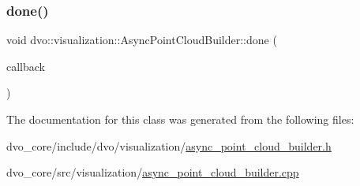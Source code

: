 \subsubsection{\texorpdfstring{done()}{done()}}
{\footnotesize\ttfamily void dvo\+::visualization\+::\+Async\+Point\+Cloud\+Builder\+::done (\begin{DoxyParamCaption}\item[{\mbox{\hyperlink{classdvo_1_1visualization_1_1_async_point_cloud_builder_aeea54b24aabbcfe12b2db923c8befc77}{Done\+Callback}} \&}]{callback }\end{DoxyParamCaption})}



The documentation for this class was generated from the following files\+:\begin{DoxyCompactItemize}
\item 
dvo\+\_\+core/include/dvo/visualization/\mbox{\hyperlink{async__point__cloud__builder_8h}{async\+\_\+point\+\_\+cloud\+\_\+builder.\+h}}\item 
dvo\+\_\+core/src/visualization/\mbox{\hyperlink{async__point__cloud__builder_8cpp}{async\+\_\+point\+\_\+cloud\+\_\+builder.\+cpp}}\end{DoxyCompactItemize}
